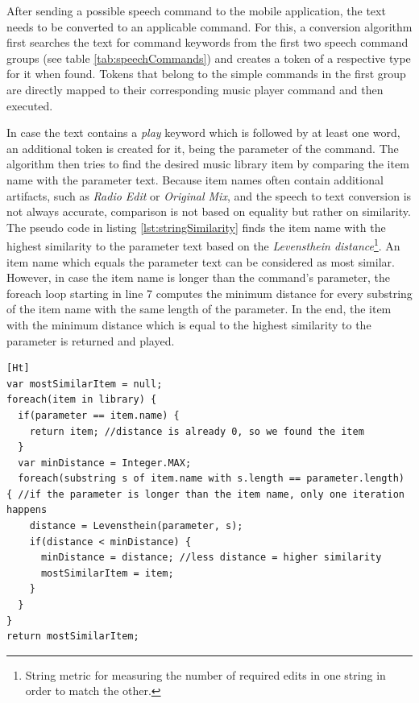 After sending a possible speech command to the mobile application, the text needs to be converted to an applicable command. For this, a conversion algorithm first searches the text for command keywords from the first two speech command groups (see table \ref{tab:speechCommands}) and creates a token of a respective type for it when found. Tokens that belong to the simple commands in the first group are directly mapped to their corresponding music player command and then executed. 

In case the text contains a \textit{play} keyword which is followed by at least one word, an additional token is created for it, being the parameter of the command. The algorithm then tries to find the desired music library item by comparing the item name with the parameter text. Because item names often contain additional artifacts, such as \textit{Radio Edit} or \textit{Original Mix}, and the speech to text conversion is not always accurate, comparison is not based on equality but rather on similarity. The pseudo code in listing \ref{lst:stringSimilarity} finds the item name with the highest similarity to the parameter text based on the \textit{Levensthein distance}\footnote{String metric for measuring the number of required edits in one string in order to match the other.}. An item name which equals the parameter text can be considered as most similar. However, in case the item name is longer than the command's parameter, the foreach loop starting in line 7 computes the minimum distance for every substring of the item name with the same length of the parameter. In the end, the item with the minimum distance which is equal to the highest similarity to the parameter is returned and played.

\begin{lstlisting}[caption=Calculating parameter and music item name similarity, label=lst:stringSimilarity][Ht]
var mostSimilarItem = null;
foreach(item in library) {
  if(parameter == item.name) { 
    return item; //distance is already 0, so we found the item
  }
  var minDistance = Integer.MAX;
  foreach(substring s of item.name with s.length == parameter.length) { //if the parameter is longer than the item name, only one iteration happens
    distance = Levensthein(parameter, s);
    if(distance < minDistance) { 
      minDistance = distance; //less distance = higher similarity
      mostSimilarItem = item;
    }
  }
}
return mostSimilarItem;
\end{lstlisting}

